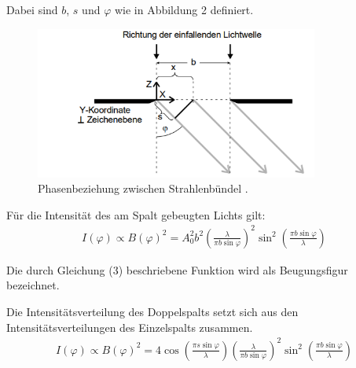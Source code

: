 Dabei sind $b$, $s$ und $\varphi$ wie in Abbildung 2 definiert.

\begin{figure}[H]
  \centering
  \includegraphics[height=5cm]{beugung.PNG}
  \caption{Phasenbeziehung zwischen Strahlenbündel \cite{sample}.}
  \label{fig:biegungbild1}
\end{figure}



Für die Intensität des am Spalt gebeugten Lichts gilt:
\begin{align}
  I(\varphi) \propto B(\varphi)^2 = A_0^2 b^2 \left(\frac{\lambda}{\pi b \sin{\varphi}} \right)^2  \sin^2{\left(\frac{\pi b \sin{\varphi}}{\lambda}\right)}
\end{align}

Die durch Gleichung (3) beschriebene Funktion wird als Beugungsfigur bezeichnet.

Die Intensitätsverteilung des Doppelspalts setzt sich aus den Intensitätsverteilungen des Einzelspalts zusammen.
\begin{align}
   I(\varphi) \propto B(\varphi)^2 = 4 \cos{\left(\frac{\pi s \sin{\varphi}}{\lambda}\right)} \left(\frac{\lambda}{\pi b \sin{\varphi}}\right)^2
   \sin^2{\left(\frac{\pi b \sin{\varphi}}{\lambda}\right)}
\end{align}
